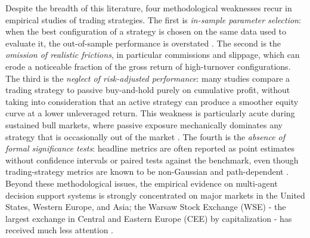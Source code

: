 \documentclass{ieeeaccess}
\begin{document}
Despite the breadth of this literature, four methodological weaknesses recur in empirical studies of trading strategies. The first is \emph{in-sample parameter selection}: when the best configuration of a strategy is chosen on the same data used to evaluate it, the out-of-sample performance is overstated \cite{bailey2014,harvey2016}. The second is the \emph{omission of realistic frictions}, in particular commissions and slippage, which can erode a noticeable fraction of the gross return of high-turnover configurations. The third is the \emph{neglect of risk-adjusted performance}: many studies compare a trading strategy to passive buy-and-hold purely on cumulative profit, without taking into consideration that an active strategy can produce a smoother equity curve at a lower unleveraged return. This weakness is particularly acute during sustained bull markets, where passive exposure mechanically dominates any strategy that is occasionally out of the market \cite{dichtl2020}. The fourth is the \emph{absence of formal significance tests}: headline metrics are often reported as point estimates without confidence intervals or paired tests against the benchmark, even though trading-strategy metrics are known to be non-Gaussian and path-dependent \cite{politis1994,bailey2014}. Beyond these methodological issues, the empirical evidence on multi-agent decision support systems is strongly concentrated on major markets in the United States, Western Europe, and Asia; the Warsaw Stock Exchange (WSE) - the largest exchange in Central and Eastern Europe (CEE) by capitalization - has received much less attention \cite{czapkiewicz2018,kompa2009,gurgul2025}.
\end{document}
